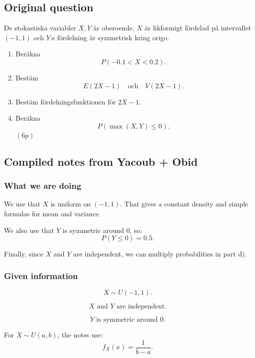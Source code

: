 \documentclass[10pt]{article}
\begin{document}
\subsection*{Original question}

De stokastiska variabler \(X,Y\) är oberoende.
\(X\) är likformigt fördelad på intervallet
\((-1,1)\) och \(Y\):s fördelning är symmetrisk
kring origo.

\begin{enumerate}[label=\alph*)]
\item Beräkna
\[
P(-0.1<X<0.2).
\]

\item Bestäm
\[
E(2X-1)
\quad\text{och}\quad
V(2X-1).
\]

\item Bestäm fördelningsfunktionen för \(2X-1\).

\item Beräkna
\[
P(\max(X,Y)\le 0).
\]
\((6p)\)
\end{enumerate}

\subsection*{Compiled notes from Yacoub + Obid}

\subsubsection*{What we are doing}

We use that \(X\) is uniform on \((-1,1)\).
That gives a constant density and simple formulas
for mean and variance.

We also use that \(Y\) is symmetric around \(0\), so:
\[
P(Y\le 0)=0.5.
\]

Finally, since \(X\) and \(Y\) are independent, we can
multiply probabilities in part d).

\subsubsection*{Given information}

\[
X\sim U(-1,1).
\]

\[
X \text{ and } Y
\text{ are independent.}
\]

\[
Y \text{ is symmetric around }0.
\]

For \(X\sim U(a,b)\), the notes use:
\[
f_X(x)=\frac{1}{b-a}.
\]
\end{document}
